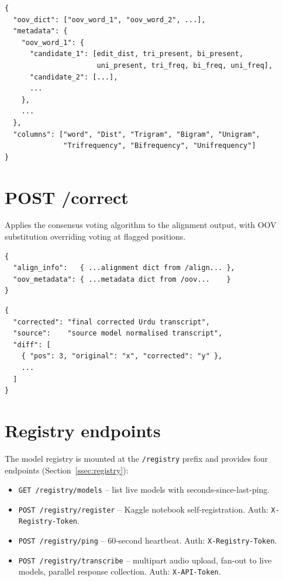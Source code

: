 \begin{lstlisting}[caption={Response body schema for \texttt{POST /oov}.}]
{
  "oov_dict": ["oov_word_1", "oov_word_2", ...],
  "metadata": {
    "oov_word_1": {
      "candidate_1": [edit_dist, tri_present, bi_present,
                      uni_present, tri_freq, bi_freq, uni_freq],
      "candidate_2": [...],
      ...
    },
    ...
  },
  "columns": ["word", "Dist", "Trigram", "Bigram", "Unigram",
              "Trifrequency", "Bifrequency", "Unifrequency"]
}
\end{lstlisting}

\section{POST /correct}
\label{app:correct}

Applies the consensus voting algorithm to the alignment output, with OOV substitution overriding voting at flagged positions.

\begin{lstlisting}[caption={Request body schema for \texttt{POST /correct}.}]
{
  "align_info":   { ...alignment dict from /align... },
  "oov_metadata": { ...metadata dict from /oov...    }
}
\end{lstlisting}

\begin{lstlisting}[caption={Response body schema for \texttt{POST /correct}.}]
{
  "corrected": "final corrected Urdu transcript",
  "source":    "source model normalised transcript",
  "diff": [
    { "pos": 3, "original": "x", "corrected": "y" },
    ...
  ]
}
\end{lstlisting}

\section{Registry endpoints}
\label{app:registry}

The model registry is mounted at the \texttt{/registry} prefix and provides four endpoints (Section~\ref{ssec:registry}):
\begin{itemize}
    \item \texttt{GET /registry/models} -- list live models with seconds-since-last-ping.
    \item \texttt{POST /registry/register} -- Kaggle notebook self-registration. Auth: \texttt{X-Registry-Token}.
    \item \texttt{POST /registry/ping} -- 60-second heartbeat. Auth: \texttt{X-Registry-Token}.
    \item \texttt{POST /registry/transcribe} -- multipart audio upload, fan-out to live models, parallel response collection. Auth: \texttt{X-API-Token}.
\end{itemize}

